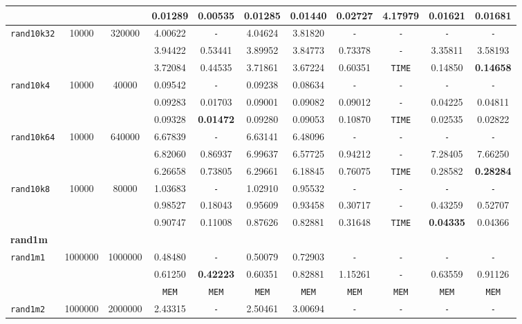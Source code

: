\begin{table}
{\begin{tabular}{ l c c | c c c c c c c c }
 &  &  & 0.01289 & 0.00535 & 0.01285 & 0.01440 & 0.02727 & 4.17979 & 0.01621 & 0.01681 \\
\hline
\verb|rand10k32| & 10000 & 320000 & 4.00622 & \verb|-| & 4.04624 & 3.81820 & \verb|-| & \verb|-| & \verb|-| & \verb|-| \\
 &  &  & 3.94422 & 0.53441 & 3.89952 & 3.84773 & 0.73378 & \verb|-| & 3.35811 & 3.58193 \\
 &  &  & 3.72084 & 0.44535 & 3.71861 & 3.67224 & 0.60351 & \verb|TIME| & 0.14850 & \textbf{0.14658} \\
\hline
\verb|rand10k4| & 10000 & 40000 & 0.09542 & \verb|-| & 0.09238 & 0.08634 & \verb|-| & \verb|-| & \verb|-| & \verb|-| \\
 &  &  & 0.09283 & 0.01703 & 0.09001 & 0.09082 & 0.09012 & \verb|-| & 0.04225 & 0.04811 \\
 &  &  & 0.09328 & \textbf{0.01472} & 0.09280 & 0.09053 & 0.10870 & \verb|TIME| & 0.02535 & 0.02822 \\
\hline
\verb|rand10k64| & 10000 & 640000 & 6.67839 & \verb|-| & 6.63141 & 6.48096 & \verb|-| & \verb|-| & \verb|-| & \verb|-| \\
 &  &  & 6.82060 & 0.86937 & 6.99637 & 6.57725 & 0.94212 & \verb|-| & 7.28405 & 7.66250 \\
 &  &  & 6.26658 & 0.73805 & 6.29661 & 6.18845 & 0.76075 & \verb|TIME| & 0.28582 & \textbf{0.28284} \\
\hline
\verb|rand10k8| & 10000 & 80000 & 1.03683 & \verb|-| & 1.02910 & 0.95532 & \verb|-| & \verb|-| & \verb|-| & \verb|-| \\
 &  &  & 0.98527 & 0.18043 & 0.95609 & 0.93458 & 0.30717 & \verb|-| & 0.43259 & 0.52707 \\
 &  &  & 0.90747 & 0.11008 & 0.87626 & 0.82881 & 0.31648 & \verb|TIME| & \textbf{0.04335} & 0.04366 \\
\hline
\multicolumn{11}{l}{\textbf{rand1m}} \\
\hline
\verb|rand1m1| & 1000000 & 1000000 & 0.48480 & \verb|-| & 0.50079 & 0.72903 & \verb|-| & \verb|-| & \verb|-| & \verb|-| \\
 &  &  & 0.61250 & \textbf{0.42223} & 0.60351 & 0.82881 & 1.15261 & \verb|-| & 0.63559 & 0.91126 \\
 &  &  & \verb|MEM| & \verb|MEM| & \verb|MEM| & \verb|MEM| & \verb|MEM| & \verb|MEM| & \verb|MEM| & \verb|MEM| \\
\hline
\verb|rand1m2| & 1000000 & 2000000 & 2.43315 & \verb|-| & 2.50461 & 3.00694 & \verb|-| & \verb|-| & \verb|-| & \verb|-| \\

\end{tabular}}
\end{table}
